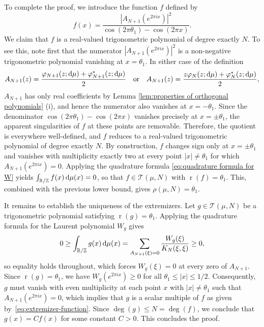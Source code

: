 \documentclass[reqno, a4paper]{amsart}
\def\T{\mathbb{R}/\mathbb{Z}}
\renewcommand{\d}{\text{\rm d}}
\renewcommand{\r}{\operatorname{r}}
\theoremstyle{plain}
\theoremstyle{definition}
\theoremstyle{remarkstyle}
\numberwithin{equation}{section}
\begin{document}
To complete the proof, we introduce the function $f$ defined by
\begin{equation*}
    f(x)=\frac{|A_{N+1}(e^{2\pi i x})|^2}{\cos(2\pi \theta_1)-\cos(2\pi x)}.
\end{equation*}
We claim that $f$ is a real-valued trigonometric polynomial of degree exactly $N$. To see this, note first that the numerator $|A_{N+1}(e^{2\pi i x})|^2$ is a non-negative trigonometric polynomial vanishing at $x = \theta_1$. In either case of the definition
\begin{equation*}
    A_{N+1}(z)=\frac{\varphi_{N+1}(z;\d\mu)+\varphi_{N+1}^*(z;\d\mu)}{2}
    \quad \text{or} \quad 
    A_{N+1}(z)=\frac{z\varphi_{N}(z;\d\mu)+\varphi_{N}^*(z;\d\mu)}{2},
\end{equation*}
$A_{N+1}$ has only real coefficients by Lemma \ref{lem:properties of orthogonal polynomials} (i), and hence the numerator also vanishes at $x = -\theta_1$. Since the denominator $\cos(2\pi\theta_1) - \cos(2\pi x)$ vanishes precisely at $x = \pm\theta_1$, the apparent singularities of $f$ at these points are removable. Therefore, the quotient is everywhere 
well-defined, and $f$ reduces to a real-valued trigonometric polynomial of degree exactly $N$. By construction, $f$ changes sign only at $x=\pm\theta_1$ and vanishes with multiplicity exactly two at every point $|x|\neq\theta_1$ for which $A_{N+1}(e^{2\pi i x})=0$. Applying the quadrature formula \eqref{eq:quadrature formula for W} yields 
$\int_{\T} f(x)\,\d\mu(x)=0$, so that $f\in\mathcal{T}(\mu, N)$ 
with $\r(f)=\theta_1$. This, combined with the previous lower bound, gives $\rho(\mu, N)=\theta_1$.

\smallskip

It remains to establish the uniqueness of the extremizers. Let $g\in\mathcal{T}(\mu, N)$ be a trigonometric polynomial satisfying $\r(g)=\theta_1$. Applying the quadrature formula for the Laurent polynomial $W_g$ gives
\begin{equation*}
    0\geq \int_{\T} g(x)\,\d\mu(x)
    =\sum_{A_{N+1}(\xi)=0}\frac{W_g(\xi)}{K_{N}(\xi, \xi)}\geq 0,
\end{equation*}
so equality holds throughout, which forces $W_g(\xi)=0$ at every zero of $A_{N+1}$. Since $\r(g)=\theta_1$, we have $W_g(e^{2\pi i x})\geq 0$ for all $\theta_1\leq |x|\leq 1/2$. Consequently, $g$ must vanish with even multiplicity at each point $x$ with $|x|\neq\theta_1$ such that $A_{N+1}(e^{2\pi i x})=0$, which implies that $g$ is a scalar multiple of $f$ as given by~\eqref{eq:extremizer-function}. Since $\deg(g)\leq N=\deg(f)$, we conclude that $g(x)=Cf(x)$ for some constant $C>0$. This concludes the proof.
\end{document}
